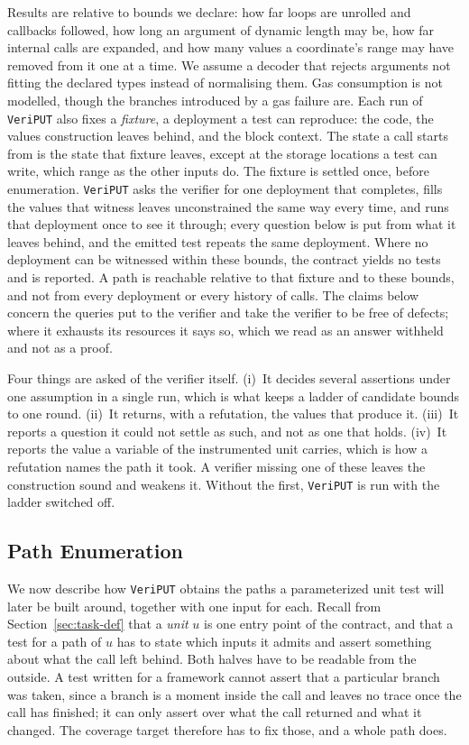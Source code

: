 \documentclass[manuscript,anonymous]{acmart}
\newcommand{\tool}[1]{\texttt{#1}}
\begin{document}
Results are relative to bounds we declare: how far loops are unrolled and
callbacks followed, how long an argument of dynamic length may be, how far
internal calls are expanded, and how many values a coordinate's range may have
removed from it one at a time. We assume a decoder that rejects arguments not
fitting the declared types instead of normalising them. Gas consumption is not
modelled, though the branches introduced by a gas failure are. Each run of
\tool{VeriPUT} also fixes a \emph{fixture}, a deployment a test can reproduce:
the code, the values construction leaves behind, and the block context. The
state a call starts from is the state that fixture leaves, except at the
storage locations a test can write, which range as the other inputs do. The
fixture is settled once, before enumeration. \tool{VeriPUT} asks the verifier
for one deployment that completes, fills the values that witness leaves
unconstrained the same way every time, and runs that deployment once to see it
through; every question below is put from what it leaves behind, and the emitted
test repeats the same deployment. Where no deployment
can be witnessed within these bounds, the contract yields no tests and is
reported. A path is reachable relative to that fixture and to these bounds, and
not from every deployment or every history of calls. The claims below concern
the queries put to the verifier and take the verifier to be free of defects;
where it exhausts its resources it says so, which we read as an answer withheld
and not as a proof.

Four things are asked of the verifier itself. (i)~It decides several assertions
under one assumption in a single run, which is what keeps a ladder of candidate
bounds to one round. (ii)~It returns, with a refutation, the values that produce
it. (iii)~It reports a question it could not settle as such, and not as one that
holds. (iv)~It reports the value a variable of the instrumented unit carries,
which is how a refutation names the path it took. A verifier missing one of
these leaves the construction sound and weakens it. Without the first,
\tool{VeriPUT} is run with the ladder switched off.

\subsection{Path Enumeration}\label{sec:enum}

We now describe how \tool{VeriPUT} obtains the paths a parameterized unit test
will later be built around, together with one input for each. Recall from
Section~\ref{sec:task-def} that a \emph{unit} $u$ is one entry point of the
contract, and that a test for a path of $u$ has to state which inputs it admits
and assert something about what the call left behind. Both halves have to be
readable from the outside. A test written for a framework cannot assert that a
particular branch was taken, since a branch is a moment inside the call and
leaves no trace once the call has finished; it can only assert over what the
call returned and what it changed. The coverage target therefore has to fix
those, and a whole path does.
\end{document}
